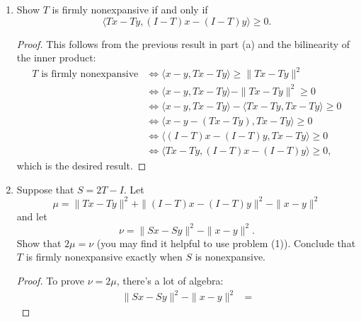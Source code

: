 \documentclass[11pt]{amsart}
\begin{document}
\begin{enumerate}
\begin{enumerate}
\begin{proof}
  ``$\Leftarrow$'': Suppose $T$ is firmly nonexpansive.


  Suppose $T$ is firmly nonexpansive.
  \begin{align*}
    \|Tx - Ty\|^2
    &+ \|(I-T) x - (I-T)y\|^2 \leq \|x-y\|^2 \\
    &\Leftrightarrow \|Tx - Ty\|^2 + \|(x-y)- (T x - T y)\|^2 \leq \|x-y\|^2 \\
    &\Leftrightarrow
      \|Tx - Ty\|^2 + \|(x-y)- (T x - T y)\|^2 \leq \|x-y\|^2 \\
    &\Leftrightarrow
      \|Tx - Ty\|^2 + \|x-y\|^2 + \|T x - T y)\|^2
      - 2\langle x - y, T x - T y\rangle \leq \|x-y\|^2 \\
    &\Leftrightarrow
      2\|Tx - Ty\|^2 \leq 2\langle x - y, T x - T y\rangle \\
    &\Leftrightarrow
      2\|Tx - Ty\|^2 \leq 2\langle x - y, T x - T y\rangle \\
    &\Leftrightarrow
      \langle x - y, T x - T y\rangle  \geq \|Tx - Ty\|^2,
  \end{align*}
  which is the desired result.
\end{proof}
\item Show $T$ is firmly nonexpansive if and only if 
\[
\langle Tx - Ty, (I-T)x - (I-T)y \rangle \geq 0. 
\]

\begin{proof}
  This follows from the previous result in part (a) and the bilinearity of the
  inner product:
  \begin{align*}
    \text{$T$ is firmly nonexpansive}
    &\Leftrightarrow \langle x-y, Tx - Ty \rangle \geq \|Tx - Ty\|^2 \\
    &\Leftrightarrow \langle x-y, Tx - Ty \rangle - \|Tx - Ty\|^2 \geq  0 \\
    &\Leftrightarrow \langle x-y, Tx - Ty \rangle - \langle Tx - Ty, Tx - Ty \rangle \geq  0 \\
    &\Leftrightarrow \langle x-y - (Tx - Ty), Tx - Ty \rangle \geq  0 \\
    &\Leftrightarrow \langle (I - T)x - (I - T)y, Tx - Ty \rangle \geq  0 \\
    &\Leftrightarrow \langle Tx - Ty, (I - T)x - (I - T)y \rangle \geq  0,
  \end{align*}
  which is the desired result.
\end{proof}

\item Suppose that $S = 2T - I$. Let 
\[
\mu = \|Tx - Ty\|^2 + \|(I-T)x - (I-T)y\|^2 - \|x-y\|^2
\]
and let 
\[
\nu = \|Sx - Sy\|^2 - \|x-y\|^2.
\]
Show that $2\mu = \nu$ (you may find it helpful to use problem (1)). Conclude that 
$T$ is firmly nonexpansive exactly when $S$ is nonexpansive.

\begin{proof}
  To prove $\nu = 2\mu$, there's a lot of algebra:
  \begin{align*}
    \|Sx - Sy\|^2 - \|x-y\|^2
    &=
  \end{align*}
\end{proof}

\end{enumerate}

\end{enumerate}
\end{document}
